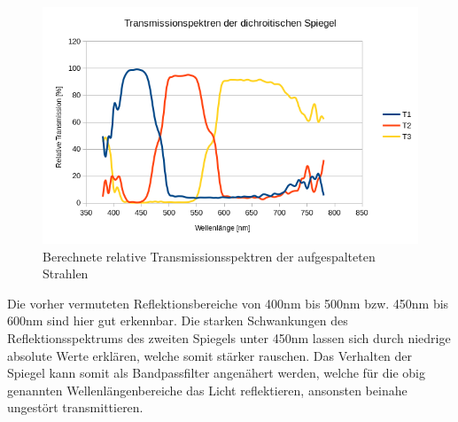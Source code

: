 \begin{figure}[h]
	\centering
	\includegraphics[scale=0.8]{Images/V2_Transmissionen.png}
	\caption{Berechnete relative Transmissionsspektren der aufgespalteten Strahlen}
	\label{V1_REFLECT}
\end{figure}

Die vorher vermuteten Reflektionsbereiche von 400nm bis 500nm bzw. 450nm bis 600nm sind hier gut erkennbar. Die starken Schwankungen des Reflektionsspektrums des zweiten Spiegels unter 450nm lassen sich durch niedrige absolute Werte erklären, welche somit stärker rauschen.
Das Verhalten der Spiegel kann somit als Bandpassfilter angenähert werden, welche für die obig genannten Wellenlängenbereiche das Licht reflektieren, ansonsten beinahe ungestört transmittieren.